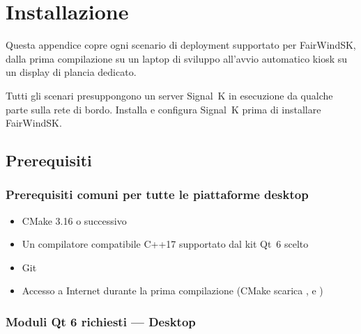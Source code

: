 \chapter{Installazione}
\label{app:installazione}

Questa appendice copre ogni scenario di deployment supportato per FairWindSK,
dalla prima compilazione su un laptop di sviluppo all'avvio automatico kiosk su
un display di plancia dedicato.

\begin{notebox}
Tutti gli scenari presuppongono un server Signal~K in esecuzione da qualche parte
sulla rete di bordo.
Installa e configura Signal~K prima di installare FairWindSK.
\end{notebox}

\section{Prerequisiti}
\label{app:prerequisiti}

\subsection{Prerequisiti comuni per tutte le piattaforme desktop}

\begin{itemize}
  \item CMake 3.16 o successivo
  \item Un compilatore compatibile C++17 supportato dal kit Qt~6 scelto
  \item Git
  \item Accesso a Internet durante la prima compilazione
        (CMake scarica ,  e )
\end{itemize}

\subsection{Moduli Qt 6 richiesti --- Desktop}

